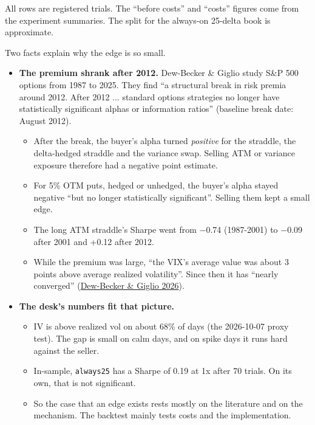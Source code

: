 \documentclass{article}
\begin{document}
All rows are registered trials. The ``before costs'' and ``costs'' figures come from the experiment summaries. The split for the always-on 25-delta book is approximate.

Two facts explain why the edge is so small.

\begin{itemize}

\item \textbf{The premium shrank after 2012.} Dew-Becker \& Giglio study S\&P 500 options from 1987 to 2025. They find ``a structural break in risk premia around 2012. After 2012 ... standard options strategies no longer have statistically significant alphas or information ratios'' (baseline break date: August 2012).

\begin{itemize}

\item After the break, the buyer's alpha turned \emph{positive} for the straddle, the delta-hedged straddle and the variance swap. Selling ATM or variance exposure therefore had a negative point estimate.

\item For 5\% OTM puts, hedged or unhedged, the buyer's alpha stayed negative ``but no longer statistically significant''. Selling them kept a small edge.

\item The long ATM straddle's Sharpe went from \ensuremath{-}0.74 (1987-2001) to \ensuremath{-}0.09 after 2001 and +0.12 after 2012.

\item While the premium was large, ``the VIX's average value was about 3 points above average realized volatility''. Since then it has ``nearly converged'' (\href{https://www.dew-becker.org/documents/option_decline.pdf}{Dew-Becker \& Giglio 2026}).

\end{itemize}

\item \textbf{The desk's numbers fit that picture.}

\begin{itemize}

\item IV is above realized vol on about 68\% of days (the 2026-10-07 proxy test). The gap is small on calm days, and on spike days it runs hard against the seller.

\item In-sample, \texttt{always25} has a Sharpe of 0.19 at 1x after 70 trials. On its own, that is not significant.

\item So the case that an edge exists rests mostly on the literature and on the mechanism. The backtest mainly tests costs and the implementation.

\end{itemize}

\end{itemize}
\end{document}
